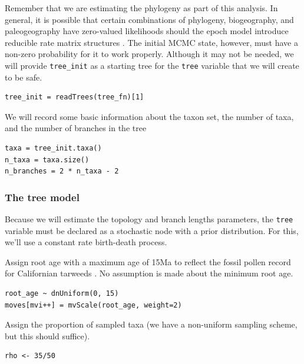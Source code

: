 Remember that we are estimating the phylogeny as part of this analysis.
In general, it is possible that certain combinations of phylogeny, biogeography, and paleogeography have zero-valued likelihoods should the epoch model introduce reducible rate matrix structures \citep[see the supplemental of][]{Buerki2011}.
The initial MCMC state, however, must have a non-zero probability for it to work properly.
Although it may not be needed, we will provide {\tt tree\_init} as a starting tree for the {\tt tree} variable that we will create to be safe.

\begin{snugshade}
\begin{lstlisting}
tree_init = readTrees(tree_fn)[1]
\end{lstlisting}
\end{snugshade}

We will record some basic information about the taxon set, the number of taxa, and the number of branches in the tree

\begin{snugshade}
\begin{lstlisting}
taxa = tree_init.taxa()
n_taxa = taxa.size()
n_branches = 2 * n_taxa - 2
\end{lstlisting}
\end{snugshade}

\subsubsection{The tree model}

Because we will estimate the topology and branch lengths parameters, the {\tt tree} variable must be declared as a stochastic node with a prior distribution.
For this, we'll use a constant rate birth-death process.

Assign root age with a maximum age of 15Ma to reflect the fossil pollen record for Californian tarweeds \citep{Baldwin1998}. No assumption is made about the minimum root age.

\begin{snugshade}
\begin{lstlisting}
root_age ~ dnUniform(0, 15)
moves[mvi++] = mvScale(root_age, weight=2)
\end{lstlisting}
\end{snugshade}

Assign the proportion of sampled taxa (we have a non-uniform sampling scheme, but this should suffice).

\begin{snugshade}
\begin{lstlisting}
rho <- 35/50
\end{lstlisting}
\end{snugshade}

